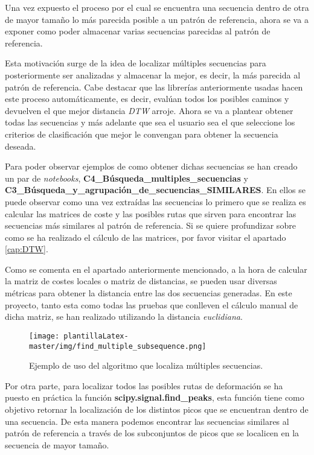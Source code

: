Una vez expuesto el proceso por el cual se encuentra una secuencia dentro de otra de mayor tamaño lo más parecida posible a un patrón de referencia, ahora se va a exponer como poder almacenar varias secuencias parecidas al patrón de referencia. 

Esta motivación surge de la idea de localizar múltiples secuencias para posteriormente ser analizadas y almacenar la mejor, es decir, la más parecida al patrón de referencia. Cabe destacar que las librerías anteriormente usadas hacen este proceso automáticamente, es decir, evalúan todos los posibles caminos y devuelven el que mejor distancia \textit{DTW} arroje. Ahora se va a plantear obtener todas las secuencias y más adelante que sea el usuario sea el que seleccione los criterios de clasificación que mejor le convengan para obtener la secuencia deseada.

Para poder observar ejemplos de como obtener dichas secuencias se han creado un par de \textit{notebooks}, \textbf{C4\_Búsqueda\_multiples\_secuencias} y \textbf{C3\_Búsqueda\_y\_agrupación\_de\_secuencias\_SIMILARES}. En ellos se puede observar como una vez extraídas las secuencias lo primero que se realiza es calcular las matrices de coste y las posibles rutas que sirven para encontrar las secuencias más similares al patrón de referencia. Si se quiere profundizar sobre como se ha realizado el cálculo de las matrices, por favor visitar el apartado \ref{cap:DTW}.

Como se comenta en el apartado anteriormente mencionado, a la hora de calcular la matriz de costes locales o matriz de distancias, se pueden usar diversas métricas para obtener la distancia entre las dos secuencias generadas. En este proyecto, tanto esta como todas las pruebas que conlleven el cálculo manual de dicha matriz, se han realizado utilizando la distancia \emph{euclidiana}. 


\begin{figure}
    \centering
    \texttt{[image: plantillaLatex-master/img/find\_multiple\_subsequence.png]}
    \caption{Ejemplo de uso del algoritmo que localiza múltiples secuencias.}
    \label{fig:multipleSec}
\end{figure}

Por otra parte, para localizar todos las posibles rutas de deformación se ha puesto en práctica la función \textbf{scipy.signal.find\_peaks}, esta función tiene como objetivo retornar la localización de los distintos picos que se encuentran dentro de una secuencia. De esta manera podemos encontrar las secuencias similares al patrón de referencia a través de los subconjuntos de picos que se localicen en la secuencia de mayor tamaño.

